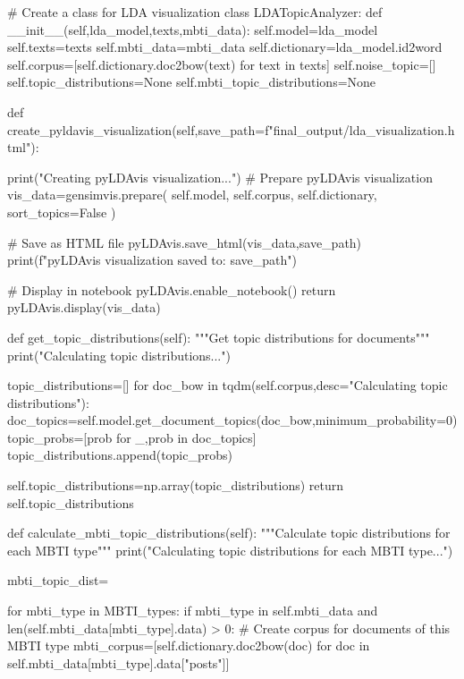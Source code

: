 \documentclass[12pt]{article}
\numberwithin{figure}{section}  %
\begin{document}
	\begin{python}
# Create a class for LDA visualization
class LDATopicAnalyzer:
    def __init__(self,lda_model,texts,mbti_data):
        self.model=lda_model
        self.texts=texts
        self.mbti_data=mbti_data
        self.dictionary=lda_model.id2word
        self.corpus=[self.dictionary.doc2bow(text) for text in texts]
        self.noise_topic=[]
        self.topic_distributions=None
        self.mbti_topic_distributions=None
        
    def create_pyldavis_visualization(self,save_path=f"final_output/lda_visualization.html"):
        
        print("Creating pyLDAvis visualization...")
        # Prepare pyLDAvis visualization
        vis_data=gensimvis.prepare(
            self.model,
            self.corpus,
            self.dictionary,
            sort_topics=False
        )
        
        # Save as HTML file
        pyLDAvis.save_html(vis_data,save_path)
        print(f"pyLDAvis visualization saved to: {save_path}")
        
        # Display in notebook
        pyLDAvis.enable_notebook()
        return pyLDAvis.display(vis_data)
    
    def get_topic_distributions(self):
        """Get topic distributions for documents"""
        print("Calculating topic distributions...")
        
        topic_distributions=[]
        for doc_bow in tqdm(self.corpus,desc="Calculating topic distributions"):
            doc_topics=self.model.get_document_topics(doc_bow,minimum_probability=0)
            topic_probs=[prob for _,prob in doc_topics]
            topic_distributions.append(topic_probs)
        
        self.topic_distributions=np.array(topic_distributions)
        return self.topic_distributions
    
    def calculate_mbti_topic_distributions(self):
        """Calculate topic distributions for each MBTI type"""
        print("Calculating topic distributions for each MBTI type...")
        
        mbti_topic_dist={}
        
        for mbti_type in MBTI_types:
            if mbti_type in self.mbti_data and len(self.mbti_data[mbti_type].data) > 0:
                # Create corpus for documents of this MBTI type
                mbti_corpus=[self.dictionary.doc2bow(doc) for doc in self.mbti_data[mbti_type].data["posts"]]
                

\end{python}
\end{document}
